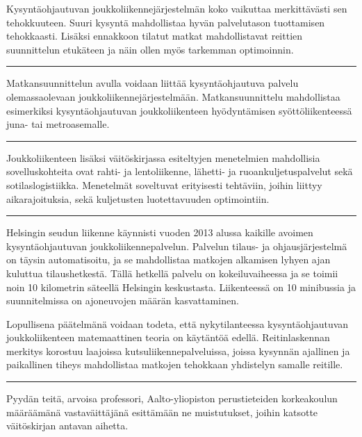 \documentclass[a4paper,12pt]{article}
\newcommand*\sepline{%
  \begin{center}
    \rule[1ex]{.5\textwidth}{.5pt}
  \end{center}}
\begin{document}
Kysyntäohjautuvan joukkoliikennejärjestelmän koko vaikuttaa
merkittävästi sen tehokkuuteen. Suuri kysyntä mahdollistaa hyvän palvelutason tuottamisen tehokkaasti.
Lisäksi ennakkoon tilatut matkat mahdollistavat reittien suunnittelun etukäteen ja näin ollen myös tarkemman optimoinnin.

\sepline

Matkansuunnittelun avulla voidaan liittää kysyntäohjautuva palvelu olemassaolevaan joukkoliikennejärjestelmään.
Matkansuunnittelu mahdollistaa esimerkiksi kysyntäohjautuvan joukkoliikenteen hyödyntämisen syöttöliikenteessä
juna- tai metroasemalle.

\sepline

Joukkoliikenteen lisäksi väitöskirjassa esiteltyjen menetelmien mahdollisia sovelluskohteita ovat 
rahti- ja lentoliikenne, lähetti- ja ruoankuljetuspalvelut sekä sotilaslogistiikka. Menetelmät 
soveltuvat erityisesti tehtäviin, joihin liittyy aikarajoituksia, sekä kuljetusten luotettavuuden optimointiin.

\sepline


Helsingin seudun liikenne käynnisti vuoden 2013 alussa kaikille avoimen kysyntäohjautuvan joukkoliikennepalvelun.
Palvelun tilaus- ja ohjausjärjestelmä on täysin automatisoitu, ja se mahdollistaa matkojen alkamisen lyhyen ajan
kuluttua tilaushetkestä. Tällä hetkellä palvelu on kokeiluvaiheessa ja se toimii noin 10 kilometrin 
säteellä Helsingin keskustasta. Liikenteessä on 10 minibussia ja suunnitelmissa on ajoneuvojen määrän kasvattaminen.

Lopullisena päätelmänä voidaan todeta, että nykytilanteessa kysyntäohjautuvan joukkoliikenteen matemaattinen teoria on käytäntöä edellä.
Reitinlaskennan merkitys korostuu laajoissa kutsuliikennepalveluissa, joissa kysynnän
ajallinen ja paikallinen tiheys mahdollistaa matkojen tehokkaan yhdistelyn samalle reitille. 

\sepline

Pyydän teitä, arvoisa professori, Aalto-yliopiston perustieteiden korkeakoulun määräämänä vastaväittäjänä esittämään ne 
muistutukset, joihin katsotte väitöskirjan antavan aihetta.
\end{document}

